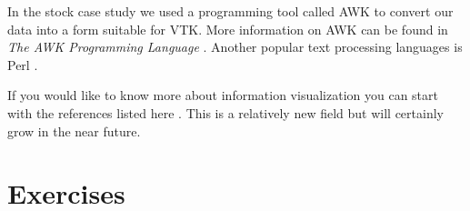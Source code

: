 In the stock case study we used a programming tool called AWK to convert our data into a form suitable for VTK. More information on AWK can be found in \emph{The AWK Programming Language} \cite{Aho88}. Another popular text processing languages is Perl \cite{Perl95}.

If you would like to know more about information visualization you can start with the references listed here \cite{Becker95} \cite{Ding90} \cite{Eick93} \cite{Feiner88} \cite{Johnson91} \cite{Robertson91}. This is a relatively new field but will certainly grow in the near future.

\printbibliography

\section{Exercises}
\label{exercises:ch_12}

